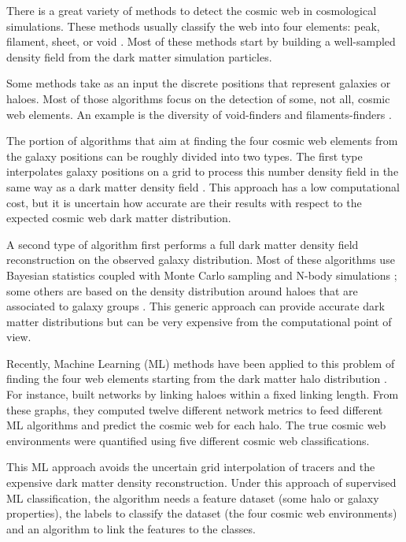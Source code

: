 \documentclass[usenatbib]{mnras}
\begin{document}
There is a great variety of methods to detect
the cosmic web in cosmological simulations.
These methods usually classify the web into four
elements: peak, filament, sheet, or void \citep{Libeskind2018}.
Most of these methods start by building a well-sampled density field from the dark matter simulation particles.

Some methods take as an input the discrete positions that represent galaxies or haloes.
Most of those algorithms focus on the detection of some, not all, cosmic web elements.
An example is the diversity of void-finders
\citep{Platen2007,Neyrinck2008} and filaments-finders
\citep{Novikov2003,Zhang2009,Sousbie2010,Chen2015,Luber2019}.   

The portion of algorithms that aim at finding the four cosmic web elements from the galaxy positions can be roughly divided into two types.
The first type interpolates galaxy positions on a grid to process this number density field in the same way as a dark matter density field \citep{Eardley2015,Alpaslan2016,Tojeiro2017,Shadab2019}.
This approach has a low computational cost, but it is uncertain 
how accurate are their results with respect to the expected cosmic web dark matter distribution.

A second type of algorithm first performs a full dark matter density field reconstruction on the observed galaxy distribution.
Most of these algorithms use Bayesian statistics coupled with Monte
Carlo sampling and N-body
simulations \citep{Jasche2010,Jasche2013a,Bos2014,LeclercqJasche2015,Horowitz2019,Burchett2020};
some others are based on the density distribution around haloes that are associated to galaxy groups \citep{Wang2009,Munoz-Cuartas2011}.
This generic approach can provide accurate dark matter distributions but can
be very expensive from the computational point of view.

Recently, Machine Learning (ML) methods 
have been applied to this problem of finding the four web elements
starting from the dark matter halo distribution \citep{Hui2018, Tsizh2019}.
For instance, 
\citep{Tsizh2019} built networks by linking haloes within a fixed linking length. 
From these graphs, they computed twelve different network metrics  to feed different ML algorithms and predict the cosmic web for each halo. The true cosmic web environments were quantified using five different cosmic web classifications.

This ML approach avoids the uncertain grid interpolation of
tracers and the expensive dark matter density reconstruction. 
Under this approach of supervised ML classification, 
the algorithm needs a feature dataset (some halo or galaxy
properties), the labels to classify the dataset (the four cosmic web
environments) and an algorithm to link the features to the classes.
\end{document}
